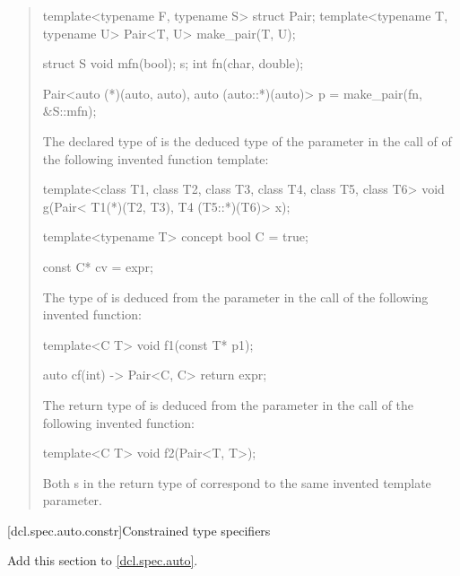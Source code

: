 \begin{quote}
\begin{addedblock}
\enterexample
\begin{codeblock}
template<typename F, typename S> struct Pair;
template<typename T, typename U> Pair<T, U> make_pair(T, U);

struct S { void mfn(bool); } s;
int fn(char, double);

Pair<auto (*)(auto, auto), auto (auto::*)(auto)> p = make_pair(fn, &S::mfn);
\end{codeblock}
The declared type of  is the deduced type of the parameter 
 in the call of  of the following 
invented function template:
\begin{codeblock}
template<class T1, class T2, class T3, class T4, class T5, class T6>
void g(Pair< T1(*)(T2, T3), T4 (T5::*)(T6)> x);
\end{codeblock}
\exitexample

\enterexample
\begin{codeblock}
template<typename T> concept bool C = true;

const C* cv = expr;
\end{codeblock}
The type of  is deduced from the parameter  in the
call  of the following invented function:
\begin{codeblock}
template<C T> void f1(const T* p1);
\end{codeblock}
\exitexample

\enterexample
\begin{codeblock}
auto cf(int) -> Pair<C, C> { return expr; }
\end{codeblock}
The return type of  is deduced from the parameter  in the
call  of the following invented function:
\begin{codeblock}
template<C T> void f2(Pair<T, T>);
\end{codeblock}
Both s in the return type of 
 correspond to the same invented template parameter.
\exitexample
\end{addedblock}
\end{quote}


[dcl.spec.auto.constr]{Constrained type specifiers}

Add this section to \ref{dcl.spec.auto}.

